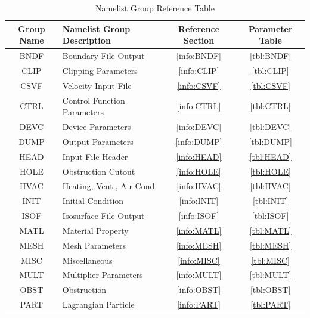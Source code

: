 \documentclass[11pt]{book}
\begin{document}
\vspace{\baselineskip}
\begin{table}[ht]
\begin{center}
\caption{Namelist Group Reference Table}
\label{tbl:namelistgroups}
\begin{tabular}{|c|l|c|c|}
\hline
Group Name  & Namelist Group Description& Reference Section & Parameter Table  \\ \hline
{\ct BNDF}  & Boundary File Output         & \ref{info:BNDF} & \ref{tbl:BNDF}  \\ \hline
{\ct CLIP}  & Clipping Parameters          & \ref{info:CLIP} & \ref{tbl:CLIP}  \\ \hline
{\ct CSVF}  & Velocity Input File          & \ref{info:CSVF} & \ref{tbl:CSVF}  \\ \hline
{\ct CTRL}  & Control Function Parameters  & \ref{info:CTRL} & \ref{tbl:CTRL}  \\ \hline
{\ct DEVC}  & Device Parameters            & \ref{info:DEVC} & \ref{tbl:DEVC}  \\ \hline
{\ct DUMP}  & Output Parameters            & \ref{info:DUMP} & \ref{tbl:DUMP}  \\ \hline
{\ct HEAD}  & Input File Header            & \ref{info:HEAD} & \ref{tbl:HEAD}  \\ \hline
{\ct HOLE}  & Obstruction Cutout           & \ref{info:HOLE} & \ref{tbl:HOLE}  \\ \hline
{\ct HVAC}  & Heating, Vent., Air Cond.    & \ref{info:HVAC} & \ref{tbl:HVAC}  \\ \hline
{\ct INIT}  & Initial Condition            & \ref{info:INIT} & \ref{tbl:INIT}  \\ \hline
{\ct ISOF}  & Isosurface File Output       & \ref{info:ISOF} & \ref{tbl:ISOF}  \\ \hline
{\ct MATL}  & Material Property            & \ref{info:MATL} & \ref{tbl:MATL}  \\ \hline
{\ct MESH}  & Mesh Parameters              & \ref{info:MESH} & \ref{tbl:MESH}  \\ \hline
{\ct MISC}  & Miscellaneous                & \ref{info:MISC} & \ref{tbl:MISC}  \\ \hline
{\ct MULT}  & Multiplier Parameters        & \ref{info:MULT} & \ref{tbl:MULT}  \\ \hline
{\ct OBST}  & Obstruction                  & \ref{info:OBST} & \ref{tbl:OBST}  \\ \hline
{\ct PART}  & Lagrangian Particle          & \ref{info:PART} & \ref{tbl:PART}  \\ \hline

\end{tabular}
\end{center}
\end{table}
\end{document}
